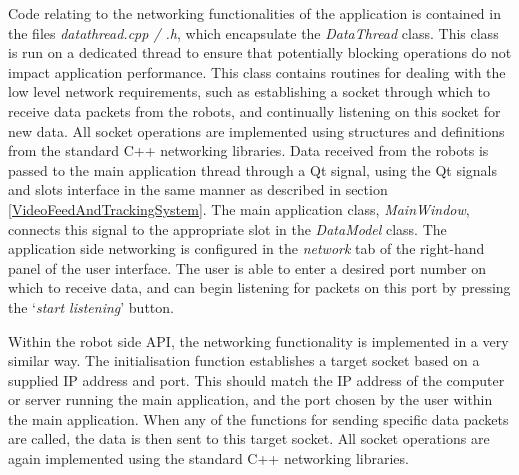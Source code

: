 Code relating to the networking functionalities of the application is contained in the files \textit{datathread.cpp / .h}, which encapsulate the \textit{DataThread} class. This class is run on a dedicated thread to ensure that potentially blocking operations do not impact application performance. This class contains routines for dealing with the low level network requirements, such as establishing a socket through which to receive data packets from the robots, and continually listening on this socket for new data. All socket operations are implemented using structures and definitions from the standard C++ networking libraries. Data received from the robots is passed to the main application thread through a Qt signal, using the Qt signals and slots interface in the same manner as described in section \ref{VideoFeedAndTrackingSystem}. The main application class, \textit{MainWindow}, connects this signal to the appropriate slot in the \textit{DataModel} class. The application side networking is configured in the \textit{network} tab of the right-hand panel of the user interface. The user is able to enter a desired port number on which to receive data, and can begin listening for packets on this port by pressing the `\textit{start listening}' button.

Within the robot side API, the networking functionality is implemented in a very similar way. The initialisation function establishes a target socket based on a supplied IP address and port. This should match the IP address of the computer or server running the main application, and the port chosen by the user within the main application. When any of the functions for sending specific data packets are called, the data is then sent to this target socket. All socket operations are again implemented using the standard C++ networking libraries.


